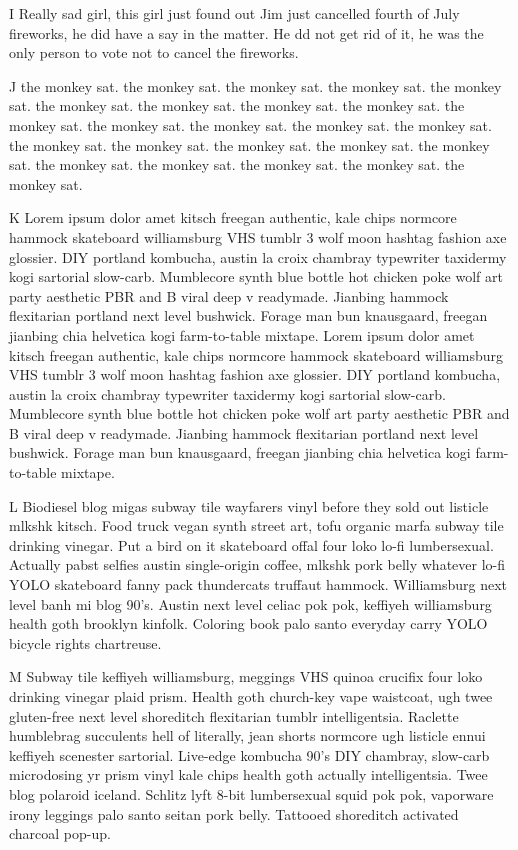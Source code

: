I Really sad girl, this girl just found out Jim just cancelled fourth of July fireworks, he did have a say in the matter. He dd not get rid of it, he was the only person to vote not to cancel the fireworks.

J the monkey sat. the monkey sat. the monkey sat. the monkey sat. the monkey sat. the monkey sat. the monkey sat. the monkey sat. the monkey sat. the monkey sat. the monkey sat. the monkey sat. the monkey sat. the monkey sat. the monkey sat. the monkey sat. the monkey sat. the monkey sat. the monkey sat. the monkey sat. the monkey sat. the monkey sat. the monkey sat. the monkey sat.

\hsize=400pt

K Lorem ipsum dolor amet kitsch freegan authentic, kale chips normcore hammock skateboard williamsburg VHS tumblr 3 wolf moon hashtag fashion axe glossier. DIY portland kombucha, austin la croix chambray typewriter taxidermy kogi sartorial slow-carb. Mumblecore synth blue bottle hot chicken poke wolf art party aesthetic PBR and B viral deep v readymade. Jianbing hammock flexitarian portland next level bushwick. Forage man bun knausgaard, freegan jianbing chia helvetica kogi farm-to-table mixtape. Lorem ipsum dolor amet kitsch freegan authentic, kale chips normcore hammock skateboard williamsburg VHS tumblr 3 wolf moon hashtag fashion axe glossier. DIY portland kombucha, austin la croix chambray typewriter taxidermy kogi sartorial slow-carb. Mumblecore synth blue bottle hot chicken poke wolf art party aesthetic PBR and B viral deep v readymade. Jianbing hammock flexitarian portland next level bushwick. Forage man bun knausgaard, freegan jianbing chia helvetica kogi farm-to-table mixtape.

L Biodiesel blog migas subway tile wayfarers vinyl before they sold out listicle mlkshk kitsch. Food truck vegan synth street art, tofu organic marfa subway tile drinking vinegar. Put a bird on it skateboard offal four loko lo-fi lumbersexual. Actually pabst selfies austin single-origin coffee, mlkshk pork belly whatever lo-fi YOLO skateboard fanny pack thundercats truffaut hammock. Williamsburg next level banh mi blog 90's. Austin next level celiac pok pok, keffiyeh williamsburg health goth brooklyn kinfolk. Coloring book palo santo everyday carry YOLO bicycle rights chartreuse.

M Subway tile keffiyeh williamsburg, meggings VHS quinoa crucifix four loko drinking vinegar plaid prism. Health goth church-key vape waistcoat, ugh twee gluten-free next level shoreditch flexitarian tumblr intelligentsia. Raclette humblebrag succulents hell of literally, jean shorts normcore ugh listicle ennui keffiyeh scenester sartorial. Live-edge kombucha 90's DIY chambray, slow-carb microdosing yr prism vinyl kale chips health goth actually intelligentsia. Twee blog polaroid iceland. Schlitz lyft 8-bit lumbersexual squid pok pok, vaporware irony leggings palo santo seitan pork belly. Tattooed shoreditch activated charcoal pop-up.


